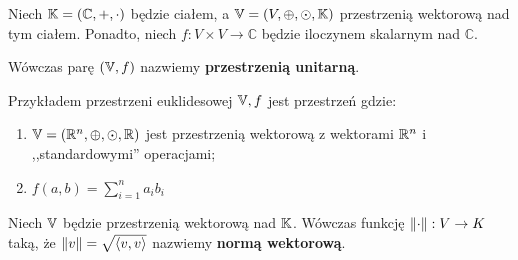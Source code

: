 \begin{definition}
Niech \(\mathbb{K} = (\mathbb{C}, +, \cdot)\) będzie ciałem, a \(\mathbb{V} = (V, \oplus, \odot, \mathbb{K})\) przestrzenią wektorową nad tym ciałem. Ponadto, niech \(f: V \times V \rightarrow \mathbb{C}\) będzie iloczynem skalarnym nad \(\mathbb{C}\).

Wówczas parę \((\mathbb{V}, f)\) nazwiemy \textbf{przestrzenią unitarną}.
\end{definition}

\begin{example}
Przykładem przestrzeni euklidesowej \(\mathbb{V}, f\) jest przestrzeń gdzie: 
\begin{enumerate}
    \item \(\mathbb{V} = (\mathbb{R}^n, \oplus, \odot, \mathbb{R})\) jest przestrzenią wektorową z wektorami \(\mathbb{R}^n\) i ,,standardowymi'' operacjami;
    \item \(f(a, b) = \sum_{i=1}^{n} a_i b_i\)
\end{enumerate}

\end{example}

\begin{definition}
Niech \(\mathbb{V}\) będzie przestrzenią wektorową nad \(\mathbb{K}\). Wówczas funkcję \(\left\Vert \cdot \right\Vert: V \rightarrow K\) taką, że \(\left\Vert v \right\Vert = \sqrt{\langle v, v \rangle}\)
 nazwiemy \textbf{normą wektorową}.
\end{definition}
